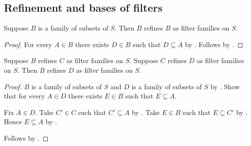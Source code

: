 \subsection{Refinement and bases of filters}

\begin{proposition}\label{filter_family_refinement_reflexive}
    Suppose $B$ is a family of subsets of $S$.
    Then $B$ refines $B$ as filter families on $S$.
\end{proposition}
\begin{proof}
    For every $A\in B$ there exists $D\in B$ such that $D\subseteq A$
        by .
    Follows by .
\end{proof}

\begin{proposition}\label{filter_family_refinement_transitive}
    Suppose $B$ refines $C$ as filter families on $S$.
    Suppose $C$ refines $D$ as filter families on $S$.
    Then $B$ refines $D$ as filter families on $S$.
\end{proposition}
\begin{proof}
    $B$ is a family of subsets of $S$ and
        $D$ is a family of subsets of $S$
        by .
    Show that for every $A\in D$ there exists $E\in B$ such that
        $E\subseteq A$.
    \begin{subproof}
        Fix $A\in D$.
        Take $C'\in C$ such that $C'\subseteq A$
            by .
        Take $E\in B$ such that $E\subseteq C'$
            by .
        Hence $E\subseteq A$ by .
    \end{subproof}
    Follows by .
\end{proof}

